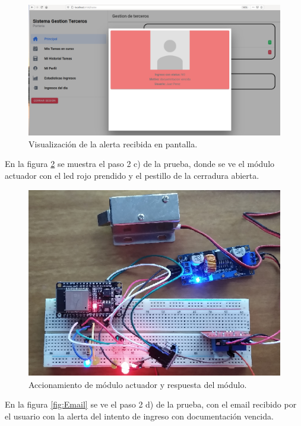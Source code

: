 \begin{figure}[ht]
	\centering
	\includegraphics[width=1\textwidth]{./Figures/ingresoNOOK.png}
	\caption{Visualización de la alerta recibida en pantalla.}
	\label{fig:ingresNOOK}
\end{figure}

En la figura \ref{fig:actuadorNOOK} se muestra el paso 2 c) de la prueba, donde se ve el módulo actuador con el led rojo prendido y el pestillo de la cerradura abierta.

\begin{figure}[ht]
	\centering
	\includegraphics[width=1\textwidth]{./Figures/actuadorNOOK.png}
	\caption{Accionamiento de módulo actuador y respuesta del módulo.}
	\label{fig:actuadorNOOK}
\end{figure}

\clearpage
En la figura \ref{fig:Email} se ve el paso 2 d) de la prueba, con el email recibido por el usuario con la alerta del intento de ingreso con documentación vencida.

